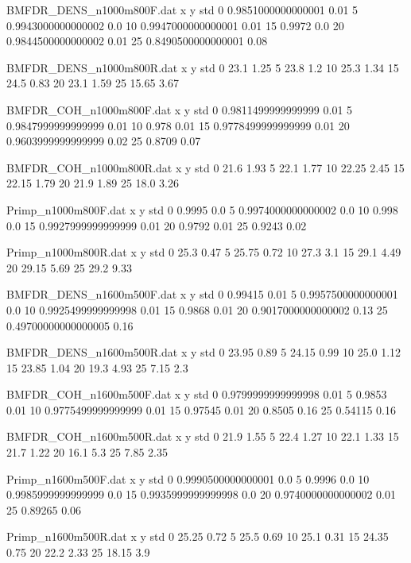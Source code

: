 \begin{filecontents}{BMFDR_DENS_n1000m800F.dat}
x y std
0 0.9851000000000001 0.01
5 0.9943000000000002 0.0
10 0.9947000000000001 0.01
15 0.9972 0.0
20 0.9844500000000002 0.01
25 0.8490500000000001 0.08
\end{filecontents}
\begin{filecontents}{BMFDR_DENS_n1000m800R.dat}
x y std
0 23.1 1.25
5 23.8 1.2
10 25.3 1.34
15 24.5 0.83
20 23.1 1.59
25 15.65 3.67
\end{filecontents}
\begin{filecontents}{BMFDR_COH_n1000m800F.dat}
x y std
0 0.9811499999999999 0.01
5 0.9847999999999999 0.01
10 0.978 0.01
15 0.9778499999999999 0.01
20 0.9603999999999999 0.02
25 0.8709 0.07
\end{filecontents}
\begin{filecontents}{BMFDR_COH_n1000m800R.dat}
x y std
0 21.6 1.93
5 22.1 1.77
10 22.25 2.45
15 22.15 1.79
20 21.9 1.89
25 18.0 3.26
\end{filecontents}
\begin{filecontents}{Primp_n1000m800F.dat}
x y std
0 0.9995 0.0
5 0.9974000000000002 0.0
10 0.998 0.0
15 0.9927999999999999 0.01
20 0.9792 0.01
25 0.9243 0.02
\end{filecontents}
\begin{filecontents}{Primp_n1000m800R.dat}
x y std
0 25.3 0.47
5 25.75 0.72
10 27.3 3.1
15 29.1 4.49
20 29.15 5.69
25 29.2 9.33
\end{filecontents}
\begin{filecontents}{BMFDR_DENS_n1600m500F.dat}
x y std
0 0.99415 0.01
5 0.9957500000000001 0.0
10 0.9925499999999998 0.01
15 0.9868 0.01
20 0.9017000000000002 0.13
25 0.49700000000000005 0.16
\end{filecontents}
\begin{filecontents}{BMFDR_DENS_n1600m500R.dat}
x y std
0 23.95 0.89
5 24.15 0.99
10 25.0 1.12
15 23.85 1.04
20 19.3 4.93
25 7.15 2.3
\end{filecontents}
\begin{filecontents}{BMFDR_COH_n1600m500F.dat}
x y std
0 0.9799999999999998 0.01
5 0.9853 0.01
10 0.9775499999999999 0.01
15 0.97545 0.01
20 0.8505 0.16
25 0.54115 0.16
\end{filecontents}
\begin{filecontents}{BMFDR_COH_n1600m500R.dat}
x y std
0 21.9 1.55
5 22.4 1.27
10 22.1 1.33
15 21.7 1.22
20 16.1 5.3
25 7.85 2.35
\end{filecontents}
\begin{filecontents}{Primp_n1600m500F.dat}
x y std
0 0.9990500000000001 0.0
5 0.9996 0.0
10 0.9985999999999999 0.0
15 0.9935999999999998 0.0
20 0.9740000000000002 0.01
25 0.89265 0.06
\end{filecontents}
\begin{filecontents}{Primp_n1600m500R.dat}
x y std
0 25.25 0.72
5 25.5 0.69
10 25.1 0.31
15 24.35 0.75
20 22.2 2.33
25 18.15 3.9
\end{filecontents}

